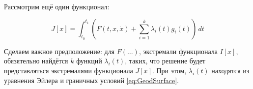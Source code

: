 \documentclass[12pt]{article}
\begin{document}
	Рассмотрим ещё один функционал:

	$$J[x] = \int_{t_0}^{t_1} \left(F(t,x,\dot{x}) + \sum_{i=1}^k \lambda_i(t) g_i(t)\right)\,dt$$

	Сделаем важное предположение: для $F(\ldots)$, экстремали функционала $I[x]$, обязятельно найдётся
	$k$ функций $\lambda_i(t)$, таких, что решение будет представляться экстремалями функционала $J[x]$.
	При этом, $\lambda_i(t)$ находятся из уравнения Эйлера и граничных условий \ref{eq:GeodSurface}.

\end{document}
